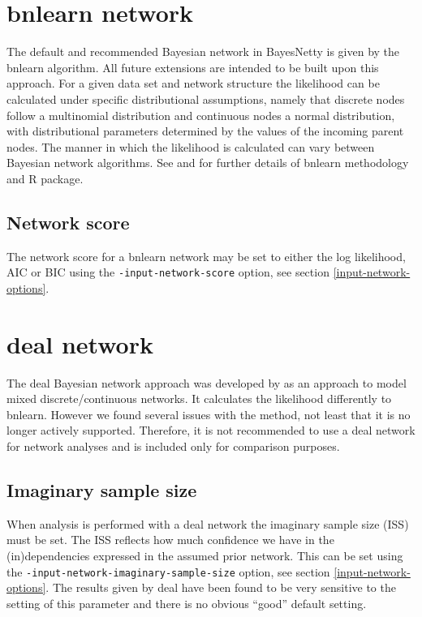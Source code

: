 \documentclass[a4paper,12pt]{article}
\newcommand{\code}[1]{{\footnotesize{{\tt #1}}}}
\begin{document}
\section{bnlearn network}
\label{bnlearn}

The default and recommended Bayesian network in BayesNetty is given by the bnlearn algorithm. All future extensions are intended to be built upon this approach. For a given data set and network structure the likelihood can be calculated under specific distributional assumptions, namely that discrete nodes follow a multinomial distribution and continuous nodes a normal distribution, with distributional parameters determined by the values of the incoming parent nodes. The manner in which the likelihood is calculated can vary between Bayesian network algorithms. See \citet{bnlearn} and \citet{bnlearn2} for further details of bnlearn methodology and R package. 
\subsection{Network score}
\label{bnlearn-score}

The network score for a bnlearn network may be set to either the log likelihood, AIC or BIC using the \code{-input-network-score} option, see  section \ref{input-network-options}. 




\section{deal network}
\label{deal}

The deal Bayesian network approach was developed by \citet{deal} as an approach to model mixed discrete/continuous networks. It calculates the likelihood differently to bnlearn. However we found several issues with the method, not least that it is no longer actively supported. Therefore, it is not recommended to use a deal network for network analyses and is included only for comparison purposes. 
\subsection{Imaginary sample size}
\label{imaginary-sample-size}

When analysis is performed with a deal network the imaginary sample size (ISS) must be set. The ISS reflects how much confidence we have in the (in)dependencies expressed in the assumed prior network. This can be set using the \code{-input-network-imaginary-sample-size} option, see  section \ref{input-network-options}. The results given by deal have been found to be very sensitive to the setting of this parameter and there is no obvious ``good'' default setting. 
\end{document}
